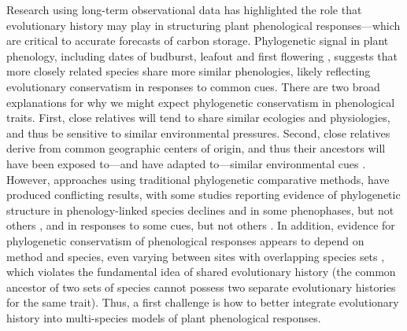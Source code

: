 \documentclass[11pt]{article}
\begin{document}
Research using long-term observational data has highlighted the role that evolutionary history may play in structuring plant phenological responses---which are critical to accurate forecasts of carbon storage. Phylogenetic signal in plant phenology, including dates of budburst, leafout and first flowering \citep{kochmer1986constraints,willis2008phylogenetic,davies2013phylogenetic}, suggests that more closely related species share more similar phenologies, likely reflecting evolutionary conservatism in responses to common cues. There are two broad explanations for why we might expect phylogenetic conservatism in phenological traits. First, close relatives will tend to share similar ecologies and physiologies, and thus be sensitive to similar environmental pressures. Second, close relatives derive from common geographic centers of origin, and thus their ancestors will have been exposed to---and have adapted to---similar environmental cues \citep{davies2013phylogenetic}. 
However, approaches using traditional phylogenetic comparative methods, have produced conflicting results, with some studies reporting evidence of phylogenetic structure in phenology-linked species declines \citep[e.g.,][]{willis2008phylogenetic} and in some phenophases, but not others \citep[e.g.,][]{CaraDonna2015}, and in responses to some cues, but not others \citep[e.g.,][]{yang2021afm}. In addition, evidence for phylogenetic conservatism of phenological responses appears to depend on method and species, even varying between sites with overlapping species sets \citep[e.g.,][]{rafferty2017global}, which violates the fundamental idea of shared evolutionary history (the common ancestor of two sets of species cannot possess two separate evolutionary histories for the same trait). Thus, a first challenge is how to better integrate evolutionary history into multi-species models of plant phenological responses.
\end{document}
